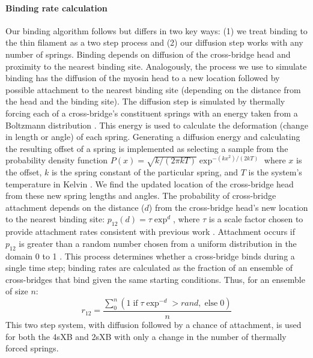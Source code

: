 \documentclass[]{article}
\begin{document}
\paragraph{Binding rate calculation} %
Our binding algorithm follows \citet{Tanner2007} but differs in two key ways: (1) we treat binding to the thin filament as a two step process and (2) our diffusion step works with any number of springs.
Binding depends on diffusion of the cross-bridge head and proximity to the nearest binding site.
Analogously, the process we use to simulate binding has the diffusion of the myosin head to a new location followed by possible attachment to the nearest binding site (depending on the distance from the head and the binding site).
The diffusion step is simulated by thermally forcing each of a cross-bridge's constituent springs with an energy taken from a Boltzmann distribution \citep{BergBook, HowardBook}.
This energy is used to calculate the deformation (change in length or angle) of each spring. 
Generating a diffusion energy and calculating the resulting offset of a spring is implemented as selecting a sample from the probability density function $P(x) = \sqrt{k / (2 \pi kT)} \exp^{-(k x^2)/(2 kT)}$ where $x$ is the offset, $k$ is the spring constant of the particular spring, and $T$ is the system's temperature in Kelvin  \citep{DillBook, HowardBook}. %
We find the updated location of the cross-bridge head from these new spring lengths and angles.
The probability of cross-bridge attachment depends on the distance ($d$) from the cross-bridge head's new location to the nearest binding site: $p_{12}(d) = \tau \exp ^{d}$, where $\tau$ is a scale factor chosen to provide attachment rates consistent with previous work \citep{Daniel1998, Tanner2007}.
Attachment occurs if $p_{12}$ is greater than a random number chosen from a uniform distribution in the domain 0 to 1 \citep{Tanner2007}.
This process determines whether a cross-bridge binds during a single time step; binding rates are calculated as the fraction of an ensemble of cross-bridges that bind given the same starting conditions. 
Thus, for an ensemble of size $n$: 
$$r_{12} =  \frac{\sum_0^n \left( 1\; \textrm{if}\; \tau \exp^{-d}>rand ,\; \textrm{else}\; 0 \right)}{n}$$
This two step system, with diffusion followed by a chance of attachment, is used for both the 4sXB and 2sXB with only a change in the number of thermally forced springs.
\end{document}
